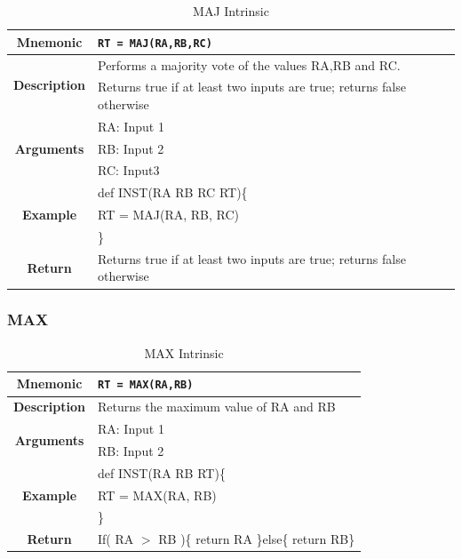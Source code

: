 \documentclass{article}
\begin{document}
\begin{table}[h]
\begin{center}
\caption{MAJ Intrinsic}
\vspace{0.125in}
\label{tab:MAJIntrinsic}
\begin{tabular}{|c|l|}
\hline
\textbf{Mnemonic} & \texttt{RT = MAJ(RA,RB,RC)}\\
\hline
\multirow{2}{*}{\textbf{Description}} & Performs a majority vote of the values RA,RB and RC.\\
             					      & Returns true if at least two inputs are true; returns false otherwise\\
\hline
\multirow{3}{*}{\textbf{Arguments}} & RA: Input 1\\
                          			     & RB: Input 2\\
			     			     & RC: Input3\\
\hline
\multirow{3}{*}{\textbf{Example}} & def INST(RA RB RC RT)\{\\
                          			  &   RT = MAJ(RA, RB, RC)\\
                                                    & \}\\
\hline
\textbf{Return} & Returns true if at least two inputs are true; returns false otherwise\\                                                    
\hline
\end{tabular}
\end{center}
\end{table}

\clearpage
\subsubsection{MAX}
\label{sec:MAX}

\begin{table}[h]
\begin{center}
\caption{MAX Intrinsic}
\vspace{0.125in}
\label{tab:MAXIntrinsic}
\begin{tabular}{|c|l|}
\hline
\textbf{Mnemonic} & \texttt{RT = MAX(RA,RB)}\\
\hline
\textbf{Description} & Returns the maximum value of RA and RB\\
\hline
\multirow{2}{*}{\textbf{Arguments}} & RA: Input 1\\
                          			     & RB: Input 2\\
\hline
\multirow{3}{*}{\textbf{Example}} & def INST(RA RB RT)\{\\
                          			  &   RT = MAX(RA, RB)\\
                                                    & \}\\
\hline
\textbf{Return} & If( RA $>$ RB )\{ return RA \}else\{ return RB\}\\                                                    
\hline
\end{tabular}
\end{center}
\end{table}
\end{document}
